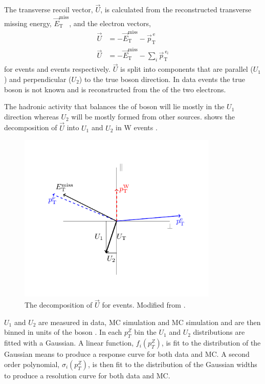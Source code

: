 The transverse recoil vector, $\vec{U}$, is calculated from the reconstructed
transverse missing energy, $\vec{E}_{\mathrm{T}}^{\mathrm{miss}}$, and the
electron \pT vectors,
\begin{align}
\vec{U} &= - \vec{E}_{\mathrm{T}}^{\mathrm{miss}} 
      - \vec{p}^{\ \mathrm{e}}_{\mathrm{T}}\\
\vec{U} &= - \vec{E}_{\mathrm{T}}^{\mathrm{miss}} 
      - \sum_i \vec{p}^{\ \mathrm{e}_i}_{\mathrm{T}}
\end{align}
for \PW events and \PZ events respectively. $\vec{U}$ is split into components
that are parallel ($U_1$) and perpendicular ($U_2$) to the true boson \pT
direction. 
In \PZ data events the true boson \pT is not known and is reconstructed from the
\pT of the two electrons.

The hadronic activity that balances the \pT of boson will lie mostly in the
$U_1$ direction whereas $U_2$ will be mostly formed from other sources.
 shows the decomposition of $\vec{U}$ into $U_1$ and
$U_2$ in W events \cite{bauer2010modeling}.
\begin{figure}
  \begin{center}
    \includegraphics*[width=0.85\textwidth]{recoil}
    \caption{The decomposition of $\vec{U}$ for \PW events. Modified from
\cite{bauer2010modeling}.}
    \label{fig:recoil}
  \end{center}
\end{figure}

$U_1$ and $U_2$ are measured in \PZ data, \PZ MC simulation and \PW MC
simulation and are then binned in units of the boson \pT.  In each $p_T^{Z}$ bin
the $U_1$ and $U_2$ distributions are fitted with a Gaussian.  A linear function,
$f_i(p_T^Z)$, is fit to the distribution of the Gaussian means to produce a
response curve for both data and MC.  A second order polynomial,
$\sigma_i(p_T^Z)$, is then fit to the distribution of the Gaussian widths to
produce a resolution curve for both data and MC\cite{bauer2010modeling}.

